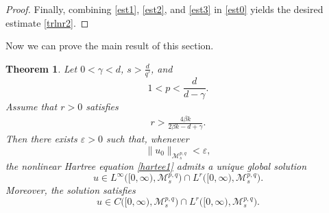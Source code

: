 \documentclass[12pt,reqno,a4paper]{amsart}
\numberwithin{equation}{section}
\theoremstyle{plain}
\newtheorem{theorem}{Theorem}[section]
\theoremstyle{definition}
\theoremstyle{remark}
\def\M{\mathcal{M}}
\def \M{{\mathcal M}}
\begin{document}
\begin{proof}
Finally, combining \eqref{est1}, \eqref{est2}, and \eqref{est3} in \eqref{est0}
yields the desired estimate \eqref{trlnr2}.
\end{proof}
Now we can prove the main result of this section.
\begin{theorem}
\label{welposedness1}
Let $0<\gamma<d$, $s>\frac{d}{q'}$, and
\[
1<p<\frac{d}{d-\gamma}.
\]
Assume that $r>0$ satisfies
\begin{align}
\label{r}
r>\frac{4\beta k}{2\beta k-d+\gamma}.
\end{align}
Then there exists $\varepsilon>0$ such that, whenever
\[
\|u_{0}\|_{\M^{p,q}_{s}}<\varepsilon,
\]
the nonlinear Hartree equation \eqref{hartee1} admits a unique global solution
\[
u\in L^{\infty}\bigl([0,\infty),\M^{p,q}_{s}\bigr)
   \cap L^{r}\bigl([0,\infty),\M^{p,q}_{s}\bigr).
\]
Moreover, the solution satisfies
\[
u\in C\bigl([0,\infty),\M^{p,q}_{s}\bigr)
   \cap L^{r}\bigl([0,\infty),\M^{p,q}_{s}\bigr).
\]
\end{theorem}
\end{document}
